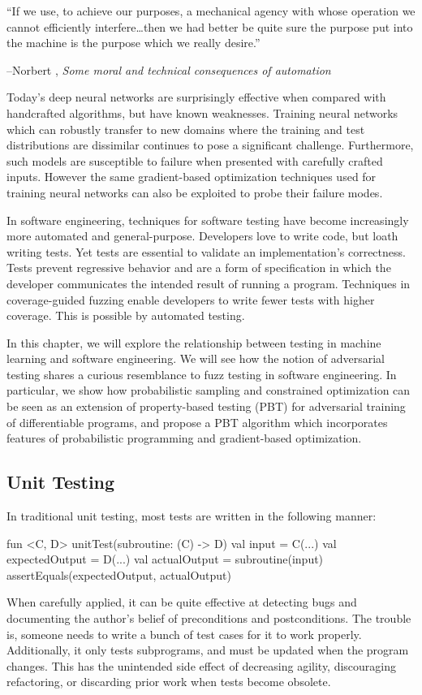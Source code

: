 \documentclass[12pt,initial,twoside,maitrise]{dms}
\numberwithin{equation}{section}
\numberwithin{table}{chapter}
\numberwithin{figure}{chapter}
\begin{document}
\setlength{\epigraphwidth}{0.80\textwidth}
\epigraph{``If we use, to achieve our purposes, a mechanical agency with whose operation we cannot efficiently interfere\ldots then we had better be quite sure the purpose put into the machine is the purpose which we really desire.''}{\begin{flushright}--Norbert \citet{wiener1960some}, \textit{Some moral and technical consequences of automation}~\end{flushright}}

Today's deep neural networks are surprisingly effective when compared with handcrafted algorithms, but have known weaknesses. Training neural networks which can robustly transfer to new domains where the training and test distributions are dissimilar continues to pose a significant challenge. Furthermore, such models are susceptible to failure when presented with carefully crafted inputs. However the same gradient-based optimization techniques used for training neural networks can also be exploited to probe their failure modes.

In software engineering, techniques for software testing have become increasingly more automated and general-purpose. Developers love to write code, but loath writing tests. Yet tests are essential to validate an implementation's correctness. Tests prevent regressive behavior and are a form of specification in which the developer communicates the intended result of running a program. Techniques in coverage-guided fuzzing enable developers to write fewer tests with higher coverage. This is possible by automated testing.

In this chapter, we will explore the relationship between testing in machine learning and software engineering. We will see how the notion of adversarial testing shares a curious resemblance to fuzz testing in software engineering. In particular, we show how probabilistic sampling and constrained optimization can be seen as an extension of property-based testing (PBT) for adversarial training of differentiable programs, and propose a PBT algorithm which incorporates features of probabilistic programming and gradient-based optimization.

\subsection{Unit Testing}

\noindent In traditional unit testing, most tests are written in the following manner:
%
\begin{kotlinlisting}
fun <C, D> unitTest(subroutine: (C) -> D) {
    val input = C(...)
    val expectedOutput = D(...)
    val actualOutput = subroutine(input)
    assertEquals(expectedOutput, actualOutput)
}
\end{kotlinlisting}
%
When carefully applied, it can be quite effective at detecting bugs and documenting the author's belief of preconditions and postconditions. The trouble is, someone needs to write a bunch of test cases for it to work properly. Additionally, it only tests subprograms, and must be updated when the program changes. This has the unintended side effect of decreasing agility, discouraging refactoring, or discarding prior work when tests become obsolete.
\end{document}
